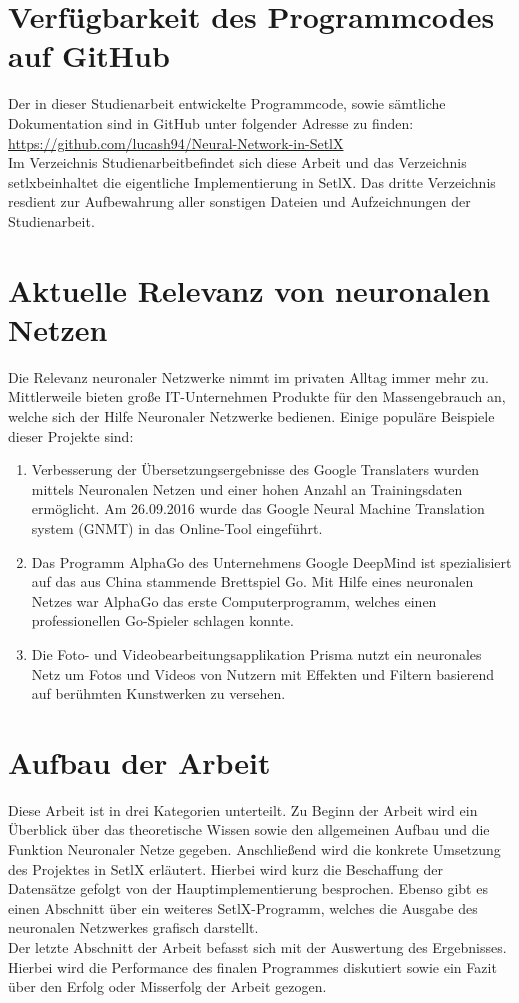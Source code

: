 \section{Verfügbarkeit des Programmcodes auf GitHub}
Der in dieser Studienarbeit entwickelte Programmcode, sowie sämtliche Dokumentation sind in GitHub unter folgender Adresse zu finden:
\\[0.2cm]
\hspace*{1.3cm}
\href{https://github.com/lucash94/Neural-Network-in-SetlX/}{https://github.com/lucash94/Neural-Network-in-SetlX}
\\[0.2cm]
Im Verzeichnis \glqq Studienarbeit\grqq befindet sich diese Arbeit und das Verzeichnis \glqq setlx\grqq beinhaltet die eigentliche Implementierung in SetlX. Das dritte Verzeichnis \glqq res\grqq dient zur Aufbewahrung aller sonstigen Dateien und Aufzeichnungen der Studienarbeit.

\section{Aktuelle Relevanz von neuronalen Netzen}
Die Relevanz neuronaler Netzwerke nimmt im privaten Alltag immer mehr zu. Mittlerweile bieten große IT-Unternehmen Produkte für den Massengebrauch an, welche sich der Hilfe Neuronaler Netzwerke bedienen. Einige populäre Beispiele dieser Projekte sind:
\begin{enumerate}
\item Verbesserung der Übersetzungsergebnisse des Google Translaters wurden mittels Neuronalen Netzen und einer hohen Anzahl an Trainingsdaten ermöglicht. Am 26.09.2016 wurde das Google Neural Machine Translation system (GNMT) in das Online-Tool eingeführt. \cite{gnmt:2017}
\item Das Programm AlphaGo des Unternehmens Google DeepMind ist spezialisiert auf das aus China stammende Brettspiel Go. Mit Hilfe eines neuronalen Netzes war AlphaGo das erste Computerprogramm, welches einen professionellen Go-Spieler schlagen konnte. \cite{alphago:2017}
\item Die Foto- und Videobearbeitungsapplikation Prisma nutzt ein neuronales Netz um Fotos und Videos von Nutzern mit Effekten und Filtern basierend auf berühmten Kunstwerken zu versehen. \cite{prismaai:2017}
\end{enumerate}

\section{Aufbau der Arbeit}
Diese Arbeit ist in drei Kategorien unterteilt. Zu Beginn der Arbeit wird ein Überblick über das theoretische Wissen sowie den allgemeinen Aufbau und die Funktion Neuronaler Netze gegeben. Anschließend wird die konkrete Umsetzung des Projektes in SetlX erläutert. Hierbei wird kurz die Beschaffung der Datensätze gefolgt von der Hauptimplementierung besprochen. Ebenso gibt es einen Abschnitt über ein weiteres SetlX-Programm, welches die Ausgabe des neuronalen Netzwerkes grafisch darstellt. \\
Der letzte Abschnitt der Arbeit befasst sich mit der Auswertung des Ergebnisses. Hierbei wird die Performance des finalen Programmes diskutiert sowie ein Fazit über den Erfolg oder Misserfolg der Arbeit gezogen.